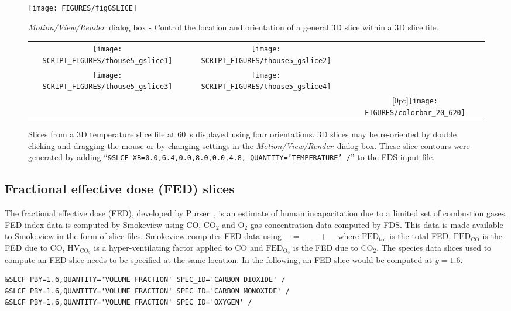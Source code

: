 \documentclass[11pt,twoside]{book}
\begin{document}
\begin{figure}[\figoptions]
\centerline{
\texttt{[image: FIGURES/figGSLICE]}
} \caption[{\em Motion/View/Render}\ dialog box - General slice
regions.]{{\em Motion/View/Render}\ dialog box - Control the
location and orientation of a general 3D slice within a 3D slice
file.} \label{figGSLICE}
\end{figure}


\begin{figure}[\figoptions]
\begin{center}
\begin{tabular}{ccc}
\texttt{[image: SCRIPT\_FIGURES/thouse5\_gslice1]}&
\texttt{[image: SCRIPT\_FIGURES/thouse5\_gslice2]}\\
\texttt{[image: SCRIPT\_FIGURES/thouse5\_gslice3]}&
\texttt{[image: SCRIPT\_FIGURES/thouse5\_gslice4]}&\\
&&\raisebox{0.0ex}[0pt]{\texttt{[image: FIGURES/colorbar\_20\_620]}}\\
\end{tabular}
\caption [General oriented temperature slices.]
{
Slices from a 3D temperature slice file at 60~s displayed using four orientations.  3D slices may be re-oriented by double clicking and dragging the mouse
or by changing settings in the {\em Motion/View/Render}\ dialog box.
These slice contours were generated by adding
``{\tt \&SLCF XB=0.0,6.4,0.0,8.0,0.0,4.8, QUANTITY='TEMPERATURE' /}'' to the FDS
input file. }
\label{figgslice}%
\end{center}
\end{figure}

\subsection{Fractional effective dose (FED) slices}
The fractional effective dose (FED), developed by Purser~\cite{SFPE:Purser}, is an estimate of human incapacitation
due to a limited set of combustion gases.
FED index data is computed by Smokeview using CO, $\mathrm{CO_2}$ and $\mathrm{O_2}$ gas
concentration data computed by FDS.
This data is made available to Smokeview in the form of slice files.
Smokeview computes FED data using
\be
{}_ = _ \times {}_ + _
\ee
where $\mathrm{FED}_\mathrm{tot}$ is the total FED, $\mathrm{FED}_\mathrm{CO}$ is the FED due to CO,
$\mathrm{HV}_\mathrm{CO_2}$ is a hyper-ventilating factor applied to CO and $\mathrm{FED}_\mathrm{O_2}$
is the FED due to $\mathrm{CO_2}$.
The species data slices used to compute an FED slice needs to be specified at the
same location.  In the following, an FED slice would be computed at $y=1.6$.
\begin{lstlisting}
&SLCF PBY=1.6,QUANTITY='VOLUME FRACTION' SPEC_ID='CARBON DIOXIDE' /
&SLCF PBY=1.6,QUANTITY='VOLUME FRACTION' SPEC_ID='CARBON MONOXIDE' /
&SLCF PBY=1.6,QUANTITY='VOLUME FRACTION' SPEC_ID='OXYGEN' /
\end{lstlisting}
\end{document}
